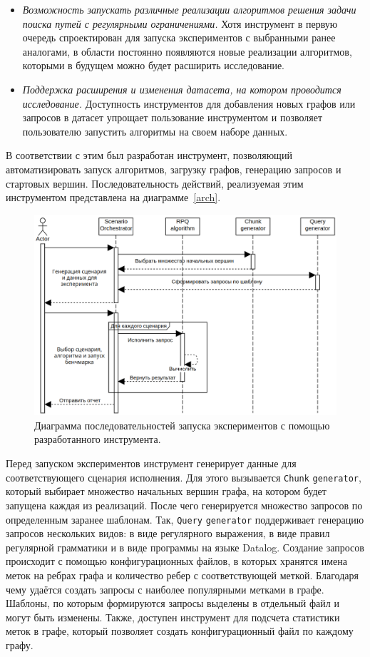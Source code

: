 \begin{itemize}
  \item \textit{Возможность запускать различные реализации алгоритмов решения задачи поиска путей с регулярными ограничениями.} Хотя инструмент в первую очередь спроектирован для запуска экспериментов с выбранными ранее аналогами, в области постоянно появляются новые реализации алгоритмов, которыми в будущем можно будет расширить исследование.
  \item \textit{Поддержка расширения и изменения датасета, на котором проводится исследование.} Доступность инструментов для добавления новых графов или запросов в датасет упрощает пользование инструментом и позволяет пользователю запустить алгоритмы на своем наборе данных.
\end{itemize}

В соответствии с этим был разработан инструмент, позволяющий автоматизировать запуск алгоритмов, загрузку графов, генерацию запросов и стартовых вершин. Последовательность действий, реализуемая этим инструментом представлена на диаграмме~\ref{arch}.

\begin{figure}[h!]
  \includegraphics[width=1\linewidth]{pictures/arch.png}
  \caption{Диаграмма последовательностей запуска экспериментов с помощью разработанного инструмента.}
\end{figure}\label{arch}

Перед запуском экспериментов инструмент генерирует данные для соответствующего сценария исполнения. Для этого вызывается \verb|Chunk| \verb|generator|, который выбирает множество начальных вершин графа, на котором будет запущена каждая из реализаций. После чего генерируется множество запросов по определенным заранее шаблонам. Так, \verb|Query| \verb|generator| поддерживает генерацию запросов нескольких видов: в виде регулярного выражения, в виде правил регулярной грамматики и в виде программы на языке Datalog. Создание запросов происходит с помощью конфигурационных файлов, в которых хранятся имена меток на ребрах графа и количество ребер с соответствующей меткой. Благодаря чему удаётся создать запросы с наиболее популярными метками в графе. Шаблоны, по которым формируются запросы выделены в отдельный файл и могут быть изменены. Также, доступен инструмент для подсчета статистики меток в графе, который позволяет создать конфигурационный файл по каждому графу.


